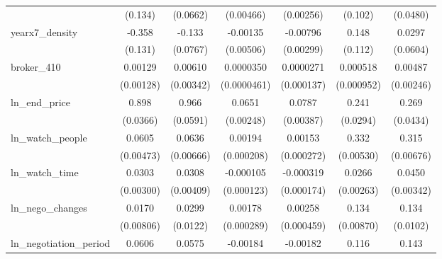 {\begin{tabular}{l*{6}{c}}
            &     (0.134)         &    (0.0662)         &   (0.00466)         &   (0.00256)         &     (0.102)         &    (0.0480)         \\
\addlinespace
yearx7\_density&      -0.358\sym{***}&      -0.133\sym{*}  &    -0.00135         &    -0.00796\sym{***}&       0.148         &      0.0297         \\
            &     (0.131)         &    (0.0767)         &   (0.00506)         &   (0.00299)         &     (0.112)         &    (0.0604)         \\
\addlinespace
broker\_410  &     0.00129         &     0.00610\sym{*}  &   0.0000350         &   0.0000271         &    0.000518         &     0.00487\sym{**} \\
            &   (0.00128)         &   (0.00342)         & (0.0000461)         &  (0.000137)         &  (0.000952)         &   (0.00246)         \\
\addlinespace
ln\_end\_price&       0.898\sym{***}&       0.966\sym{***}&      0.0651\sym{***}&      0.0787\sym{***}&       0.241\sym{***}&       0.269\sym{***}\\
            &    (0.0366)         &    (0.0591)         &   (0.00248)         &   (0.00387)         &    (0.0294)         &    (0.0434)         \\
\addlinespace
ln\_watch\_people&      0.0605\sym{***}&      0.0636\sym{***}&     0.00194\sym{***}&     0.00153\sym{***}&       0.332\sym{***}&       0.315\sym{***}\\
            &   (0.00473)         &   (0.00666)         &  (0.000208)         &  (0.000272)         &   (0.00530)         &   (0.00676)         \\
\addlinespace
ln\_watch\_time&      0.0303\sym{***}&      0.0308\sym{***}&   -0.000105         &   -0.000319\sym{*}  &      0.0266\sym{***}&      0.0450\sym{***}\\
            &   (0.00300)         &   (0.00409)         &  (0.000123)         &  (0.000174)         &   (0.00263)         &   (0.00342)         \\
\addlinespace
ln\_nego\_changes&      0.0170\sym{**} &      0.0299\sym{**} &     0.00178\sym{***}&     0.00258\sym{***}&       0.134\sym{***}&       0.134\sym{***}\\
            &   (0.00806)         &    (0.0122)         &  (0.000289)         &  (0.000459)         &   (0.00870)         &    (0.0102)         \\
\addlinespace
ln\_negotiation\_period&      0.0606\sym{***}&      0.0575\sym{***}&    -0.00184\sym{***}&    -0.00182\sym{***}&       0.116\sym{***}&       0.143\sym{***}\\

\end{tabular}}
